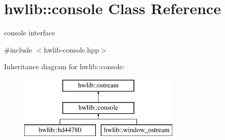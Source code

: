 \hypertarget{classhwlib_1_1console}{}\section{hwlib\+:\+:console Class Reference}
\label{classhwlib_1_1console}


console interface  




{\ttfamily \#include $<$hwlib-\/console.\+hpp$>$}

Inheritance diagram for hwlib\+:\+:console\+:\begin{figure}[H]
\begin{center}
\leavevmode
\includegraphics[height=3.000000cm]{classhwlib_1_1console}
\end{center}
\end{figure}
